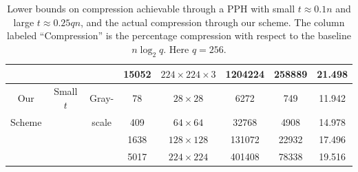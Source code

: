 \documentclass[pdflatex,sn-mathphys-num]{sn-jnl}
\theoremstyle{definition}
\begin{document}
\begin{table}[]
{\begin{tabular}{c|c|c|c|c|c|c|c}
         &  & & 15052 & $224 \times 224 \times 3$ & 1204224 & 258889 & 21.498\\
         \hline 
         Our & Small $t$ & Gray- & 78 & $28 \times 28$ & 6272 & 749 & 11.942 \\
         Scheme & & scale & 409 & $64 \times 64$ & 32768 & 4908 & 14.978 \\
         & & & 1638 & $128 \times 128$ & 131072 & 22932 & 17.496 \\
         & & & 5017 & $224 \times 224$ & 401408 & 78338 & 19.516\\
         \hline
    \end{tabular}
\ifisfullpaper
    }
\fi
        \caption{Lower bounds on compression achievable through a PPH with small $t \approx 0.1 n$ and large $t \approx 0.25qn$, and the actual compression through our scheme. The column labeled ``Compression'' is the percentage compression with respect to the baseline $n \log_2 q$. Here $q = 256$.}
    \label{tab:compression-rates}
\end{table}



\end{document}
